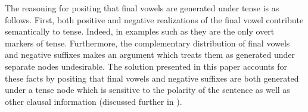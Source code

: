 \documentclass[output=paper]{langsci/langscibook}
\begin{document}
% 
% 
% 



 





The reasoning for positing that final vowels are generated under tense is as follows. First, both positive and negative realizations of the final vowel contribute semantically to tense. Indeed, in examples such as  they are the only overt markers of tense. Furthermore, the complementary distribution of final vowels and negative suffixes makes an argument which treats them as generated under separate nodes undesirable. The solution presented in this paper accounts for these facts by positing that final vowels and negative suffixes are both generated under a tense node which is sensitive to the polarity of the sentence as well as other clausal information (discussed further in ).

\end{document}
